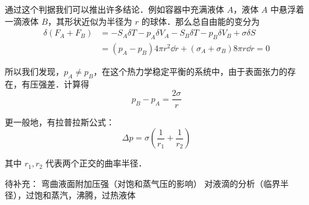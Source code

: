 通过这个判据我们可以推出许多结论．例如容器中充满液体 $A$，液体 $A$ 中悬浮着一滴液体 $B$，其形状近似为半径为 $r$ 的球体．那么总自由能的变分为
\begin{align}
\delta(F_A+F_B)&=-S_A\delta T-p_A\delta V_A-S_B\delta T-p_B\delta V_B+\sigma\delta S\\
&=(p_A-p_B)4\pi r^2\dd r + (\sigma_A+\sigma_B)8\pi r\dd r=0
\end{align}

所以我们发现，$p_A\neq p_B$，在这个热力学稳定平衡的系统中，由于表面张力的存在，有压强差．计算得
\begin{equation}
p_B-p_A=\frac{2\sigma}{r}
\end{equation}

更一般地，有拉普拉斯公式：
\begin{equation}\label{sftens_eq1}
\Delta p = \sigma \left(\frac{1}{r_1}+\frac{1}{r_2}\right)
\end{equation}

其中 $r_1,r_2$ 代表两个正交的曲率半径．

待补充：
弯曲液面附加压强（对饱和蒸气压的影响）
对液滴的分析（临界半径），过饱和蒸汽，沸腾，过热液体